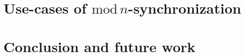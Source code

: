 \documentclass[11pt,letterpaper]{article}
\begin{document}
\section{Use-cases of $\mathrm{mod}\,n$-synchronization}

\section{Conclusion and future work}


\printbibliography
\end{document}
